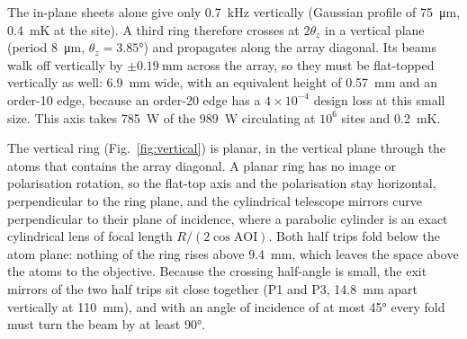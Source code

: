\documentclass[11pt]{article}
\begin{document}
The in-plane sheets alone give only \SI{0.7}{\kilo\hertz} vertically (Gaussian profile of
\SI{75}{\micro\metre}, \SI{0.4}{\milli\kelvin} at the site). A third ring therefore crosses at
$2\theta_z$ in a vertical plane (period \SI{8}{\micro\metre}, $\theta_z = \ang{3.85}$) and propagates
along the array diagonal. Its beams walk off vertically by $\pm\SI{0.19}{\milli\metre}$ across the
array, so they must be flat-topped vertically as well: \SI{6.9}{\milli\metre} wide, with an equivalent
height of \SI{0.57}{\milli\metre} and an order-10 edge, because an order-20 edge has a
$4\times10^{-4}$ design loss at this small size. This axis takes \SI{785}{\watt} of the
\SI{989}{\watt} circulating at $10^{6}$ sites and \SI{0.2}{\milli\kelvin}.

The vertical ring (Fig.~\ref{fig:vertical}) is planar, in the vertical plane through the atoms that
contains the array diagonal. A planar ring has no image or polarisation rotation, so the flat-top axis
and the polarisation stay horizontal, perpendicular to the ring plane, and the cylindrical telescope
mirrors curve perpendicular to their plane of incidence, where a parabolic cylinder is an exact
cylindrical lens of focal length $R/(2\cos\mathrm{AOI})$. Both half trips fold below the atom plane:
nothing of the ring rises above \SI{9.4}{\milli\metre}, which leaves the space above the atoms to the
objective. Because the crossing half-angle is small, the exit mirrors of the two half trips sit close
together (P1 and P3, \SI{14.8}{\milli\metre} apart vertically at \SI{110}{\milli\metre}), and with an
angle of incidence of at most \ang{45} every fold must turn the beam by at least \ang{90}.
\end{document}

